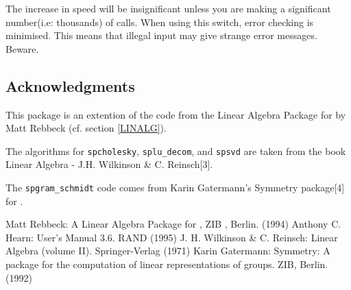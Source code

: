 The increase in speed will be insignificant unless you are making a 
significant number(i.e: thousands) of calls. When using this switch, 
error checking is minimised. This means that illegal input may give
strange error messages. Beware.

\subsection{Acknowledgments}
This package is an extention of the code from the Linear Algebra Package
for \REDUCE{} by Matt Rebbeck (cf. section \ref{LINALG}).

The algorithms for \texttt{spcholesky}, \texttt{splu\_decom}, and \texttt{spsvd} are 
taken from the book Linear Algebra - J.H. Wilkinson \& C. Reinsch[3].

The \texttt{spgram\_schmidt} code comes from Karin Gatermann's Symmetry 
package[4] for {\REDUCE}.


\begin{thebibliography}{}
 Matt Rebbeck: A Linear Algebra Package for {\REDUCE}, ZIB
, Berlin. (1994)
 Anthony C. Hearn: {\REDUCE} User's Manual 3.6.
	RAND (1995)
 J. H. Wilkinson \& C. Reinsch: Linear Algebra 
(volume II). Springer-Verlag (1971)
 Karin Gatermann: Symmetry: A {\REDUCE} package for the 
computation of linear representations of groups. ZIB, Berlin. (1992)
\end{thebibliography}
